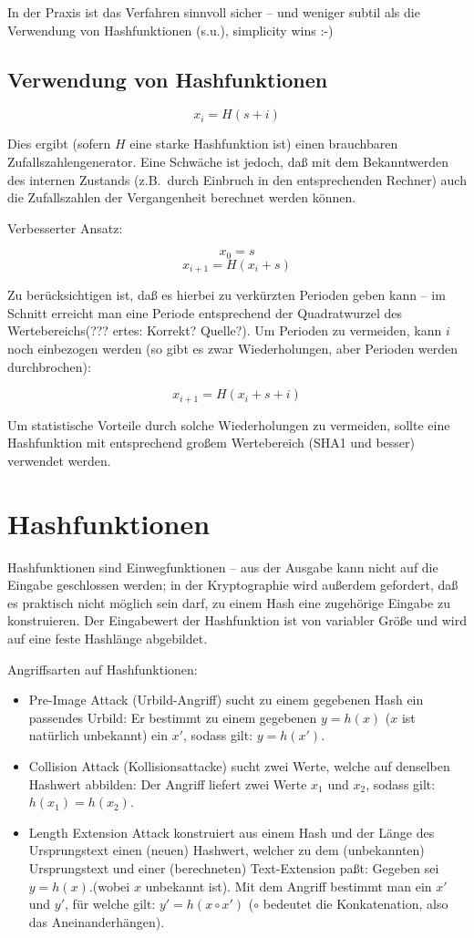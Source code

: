 In der Praxis ist das Verfahren sinnvoll sicher -- und weniger subtil als die Verwendung von Hashfunktionen (s.u.), simplicity wins :-)

\section{Verwendung von Hashfunktionen}

$$x_i = H(s+i) $$

Dies ergibt (sofern $H$ eine starke Hashfunktion ist) einen brauchbaren Zufallszahlengenerator. Eine Schwäche ist jedoch, daß mit dem Bekanntwerden des internen Zustands (z.B.~durch Einbruch in den entsprechenden Rechner) auch die Zufallszahlen der Vergangenheit berechnet werden können.

Verbesserter Ansatz:

$$x_0 = s$$
$$x_{i+1} = H(x_i + s)$$

Zu berücksichtigen ist, daß es hierbei zu verkürzten Perioden geben kann -- im Schnitt erreicht man eine Periode entsprechend der Quadratwurzel des Wertebereichs(??? ertes: Korrekt? Quelle?). Um Perioden zu vermeiden, kann $i$ noch einbezogen werden (so gibt es zwar Wiederholungen, aber Perioden werden durchbrochen):

$$x_{i+1} = H(x_i + s + i)$$

Um statistische Vorteile durch solche Wiederholungen zu vermeiden, sollte eine Hashfunktion mit entsprechend großem Wertebereich (SHA1 und besser) verwendet werden.


\chapter{Hashfunktionen}

Hashfunktionen sind Einwegfunktionen -- aus der Ausgabe kann nicht auf die Eingabe geschlossen werden; in der Kryptographie wird außerdem gefordert, daß es praktisch nicht möglich sein darf, zu einem Hash eine zugehörige Eingabe zu konstruieren. Der Eingabewert der Hashfunktion ist von variabler Größe und wird auf eine feste Hashlänge abgebildet.

Angriffsarten auf Hashfunktionen:
\begin{itemize}
\item{Pre-Image Attack (Urbild-Angriff)} sucht zu einem gegebenen Hash ein passendes Urbild: Er bestimmt zu einem gegebenen $y=h(x)$ ($x$ ist natürlich unbekannt) ein $x'$, sodass gilt: $y=h(x')$.
\item{Collision Attack (Kollisionsattacke)} sucht zwei Werte, welche auf denselben Hashwert abbilden: Der Angriff liefert zwei Werte $x_1$ und $x_2$, sodass gilt: $h(x_1)=h(x_2)$.
\item{Length Extension Attack} konstruiert aus einem Hash und der Länge des Ursprungstext einen (neuen) Hashwert, welcher zu dem (unbekannten) Ursprungstext und einer (berechneten) Text-Extension paßt: Gegeben sei $y = h(x)$.(wobei $x$ unbekannt ist). Mit dem Angriff bestimmt man ein $x'$ und $y'$, für welche gilt: $ y' = h(x \circ x')$ ($\circ$ bedeutet die Konkatenation, also das Aneinanderhängen).
\end{itemize}

